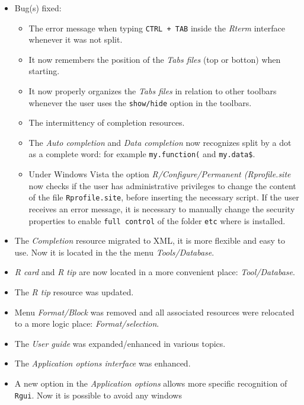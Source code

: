 \begin{itemize}
  \item Bug(s) fixed:
    \begin{itemize}
      \item The error message when typing \texttt{CTRL + TAB} inside
        the \textit{Rterm} interface whenever it was not split.
      \item It now remembers the position of the \textit{Tabs files}
        (top or botton) when starting.
      \item It now properly organizes the \textit{Tabs files} in
        relation to other toolbars whenever the user uses the
        \texttt{show/hide} option in the toolbars.
      \item The intermittency of completion resources.
      \item The \textit{Auto completion} and \textit{Data completion}
        now recognizes split by a dot as a complete word: for example
        \texttt{my.function(} and \texttt{my.data\$}.
      \item Under Windows Vista the option \textit{R/Configure/Permanent
          (Rprofile.site} now checks if the user has administrative
        privileges to change the content of the file \texttt{Rprofile.site},
        before inserting the necessary script. If the user receives an error
        message, it is necessary to manually change the security
        properties to enable \texttt{full control} of the folder
        \texttt{etc} where \RR{} is installed.
    \end{itemize}
  \item The \textit{Completion} resource migrated to XML, it is more flexible
    and easy to use. Now it is located in the the menu \textit{Tools/Database}.
  \item \textit{R card} and \textit{R tip} are now located in a more
    convenient place: \textit{Tool/Database}.
  \item The \textit{R tip} resource was updated.
  \item Menu \textit{Format/Block} was removed and all associated resources
    were relocated to a more logic place: \textit{Format/selection}.
  \item The \textit{User guide} was expanded/enhanced in various topics.
  \item The \textit{Application options interface} was enhanced.
  \item A new option in the \textit{Application options} allows more specific
    recognition of \texttt{Rgui}. Now it is possible to avoid any windows

\end{itemize}
